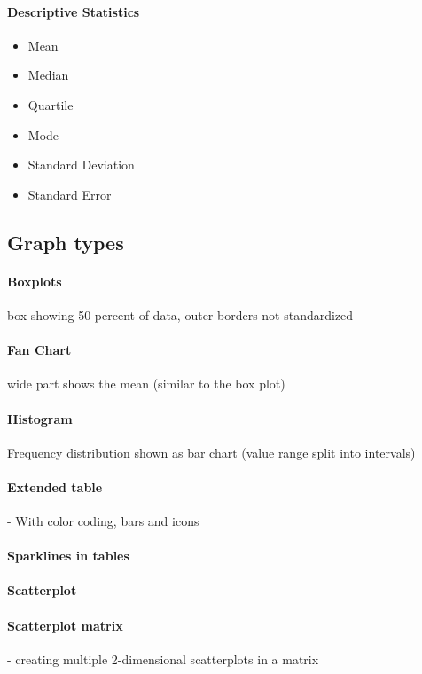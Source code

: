 \documentclass[10pt,a4paper]{article}
\begin{document}
	\paragraph{Descriptive Statistics}
	\begin{itemize}
		\item Mean
		\item Median
		\item Quartile
		\item Mode
		\item Standard Deviation
		\item Standard Error
	\end{itemize}

	\subsection{Graph types}
		
		\paragraph{Boxplots} box showing 50 percent of data, outer borders not standardized
		\paragraph{Fan Chart} wide part shows the mean (similar to the box plot) 
		\paragraph{Histogram} Frequency distribution shown as bar chart (value range split into intervals)
		
		\paragraph{Extended table} - With color coding, bars and icons
		\paragraph{Sparklines in tables}
		
		\paragraph{Scatterplot}
		\paragraph{Scatterplot matrix} - creating multiple 2-dimensional scatterplots in a matrix
		
\end{document}
